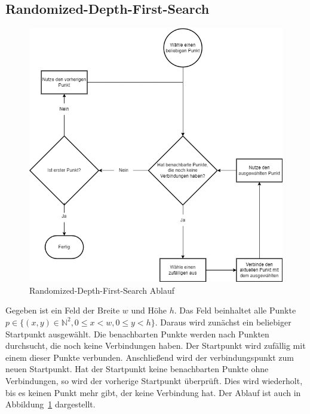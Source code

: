 \documentclass[12pt]{article}
\begin{document}
        \subsection{Randomized-Depth-First-Search}\label{subsec:randomized-depth-first-search}
            \begin{figure}
                \centering
                \includegraphics[width=\paperwidth/2]{../assets/img/Randomised-Depth-First-Search}
                \caption{Randomized-Depth-First-Search Ablauf}
                \label{fig:randomized-depth-first-search-flow}
            \end{figure}
            Gegeben ist ein Feld der Breite $w$ und Höhe $h$.
            Das Feld beinhaltet alle Punkte $p\in\{(x,y)\in\mathbb{N}^2, 0\leq x<w, 0\leq y<h\}$.
            Daraus wird zunächst ein beliebiger Startpunkt ausgewählt.
            Die benachbarten Punkte werden nach Punkten durchsucht, die noch keine Verbindungen haben.
            Der Startpunkt wird zufällig mit einem dieser Punkte verbunden.
            Anschließend wird der verbindungspunkt zum neuen Startpunkt.
            Hat der Startpunkt keine benachbarten Punkte ohne Verbindungen, so wird der vorherige Startpunkt überprüft.
            Dies wird wiederholt, bis es keinen Punkt mehr gibt, der keine Verbindung hat.
            Der Ablauf ist auch in Abbildung~\ref{fig:randomized-depth-first-search-flow} dargestellt.
\end{document}
